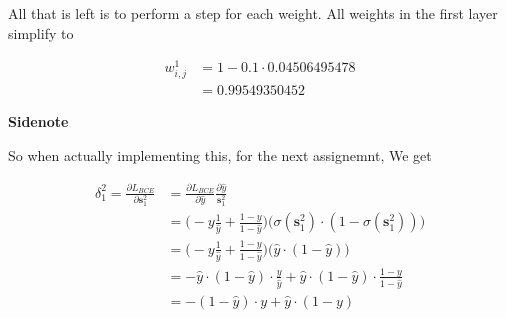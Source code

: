 \documentclass{article}
\begin{document}
	 All that is left is to perform a step for each weight. All weights in the first layer simplify to 
	 
	 \begin{align}
	 	w^1_{i, j} &= 1 - 0.1\cdot 0.04506495478\\
	 	&= 0.99549350452
	 \end{align}
	 
	 \textbf{Sidenote}
	 
	 So when actually implementing this, for the next assignemnt, We get 

	\begin{align}
	 	\delta^2_1 = \frac{\partial L_{BCE}}{\partial \mathbf{s}^2_1} &= \frac{\partial L_{BCE}}{\partial \hat{y}} \frac{\partial \hat{y}}{\mathbf{s}^2_1} \\
	 	&= \bigg( -y\frac{1}{\hat{y}}  + \frac{1-y}{1-\hat{y}} \bigg) \bigg( \sigma(\mathbf{s}^2_1)\cdot(1-\sigma(\mathbf{s}^2_1)) \bigg)\\
	 	&= \bigg( -y\frac{1}{\hat{y}}  + \frac{1-y}{1-\hat{y}} \bigg) \bigg(\hat{y}\cdot(1-\hat{y}) \bigg)\\
	 	&=  - \hat{y}\cdot(1-\hat{y})  \cdot \frac{y}{\hat{y}}  + \hat{y}\cdot(1-\hat{y}) \cdot \frac{1-y}{1-\hat{y}} \\
	 	&=  - (1-\hat{y})  \cdot y + \hat{y} \cdot (1-y)
	 \end{align}









	
	
	
	
	
	
	
\end{document}
